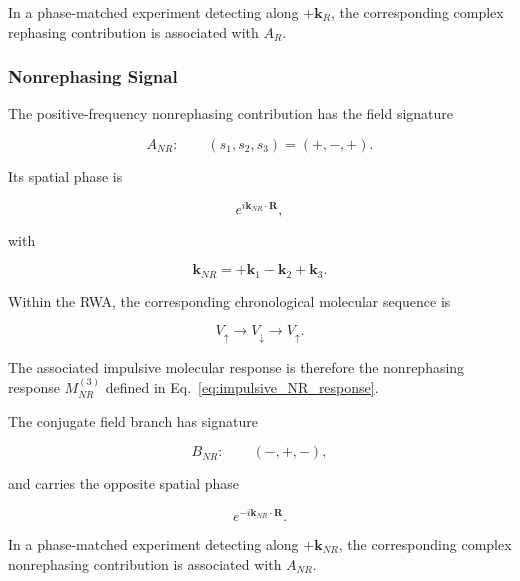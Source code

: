 \documentclass[11pt]{article}
\begin{document}
In a phase-matched experiment detecting along
$+\mathbf{k}_R$, the corresponding complex rephasing contribution is
associated with $A_R$.


\subsubsection{Nonrephasing Signal}

The positive-frequency nonrephasing contribution has the field
signature

\begin{equation}
\boxed{
A_{NR}:
\qquad
(s_1,s_2,s_3)
=
(+,-,+).
}
\label{eq:ANR_signature}
\end{equation}

Its spatial phase is

\begin{equation}
e^{i\mathbf{k}_{NR}\cdot\mathbf{R}},
\end{equation}

with

\begin{equation}
\boxed{
\mathbf{k}_{NR}
=
+\mathbf{k}_1
-
\mathbf{k}_2
+
\mathbf{k}_3.
}
\label{eq:k_nonrephasing}
\end{equation}

Within the RWA, the corresponding chronological molecular sequence is

\begin{equation}
\boxed{
V_{\uparrow}
\rightarrow
V_{\downarrow}
\rightarrow
V_{\uparrow}.
}
\end{equation}

The associated impulsive molecular response is therefore the
nonrephasing response $M_{NR}^{(3)}$ defined in
Eq.~\eqref{eq:impulsive_NR_response}.

The conjugate field branch has signature

\begin{equation}
\boxed{
B_{NR}:
\qquad
(-,+,-),
}
\end{equation}

and carries the opposite spatial phase

\begin{equation}
e^{-i\mathbf{k}_{NR}\cdot\mathbf{R}}.
\end{equation}

In a phase-matched experiment detecting along
$+\mathbf{k}_{NR}$, the corresponding complex nonrephasing
contribution is associated with $A_{NR}$.
\end{document}
